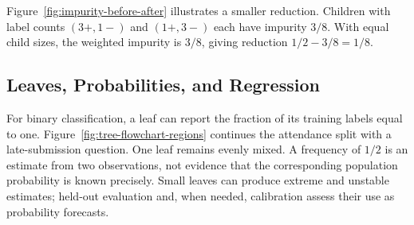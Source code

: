 Figure~\ref{fig:impurity-before-after} illustrates a smaller reduction. Children with label counts $(3+,1-)$ and $(1+,3-)$ each have impurity $3/8$. With equal child sizes, the weighted impurity is $3/8$, giving reduction $1/2-3/8=1/8$.

\par\addvspace{\intextsep}\noindent\begin{minipage}{\linewidth}
\centering
{}
\label{fig:impurity-before-after}
\end{minipage}\par\addvspace{\intextsep}

\subsection{Leaves, Probabilities, and Regression}

For binary classification, a leaf can report the fraction of its training labels equal to one. Figure~\ref{fig:tree-flowchart-regions} continues the attendance split with a late-submission question. One leaf remains evenly mixed. A frequency of $1/2$ is an estimate from two observations, not evidence that the corresponding population probability is known precisely. Small leaves can produce extreme and unstable estimates; held-out evaluation and, when needed, calibration assess their use as probability forecasts.

